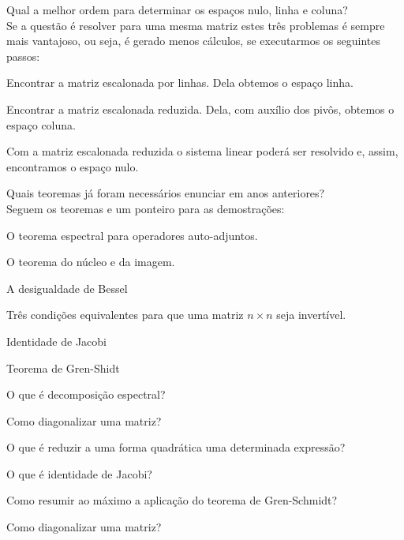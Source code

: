 Qual a melhor ordem para determinar os espaços nulo, linha e coluna?
\\Se a questão é resolver para uma mesma matriz estes três problemas é sempre mais vantajoso, ou seja, é gerado menos cálculos, se executarmos os seguintes passos:
\item Encontrar a matriz escalonada por linhas. Dela obtemos o espaço linha.
\item Encontrar a matriz escalonada reduzida. Dela, com auxílio dos pivôs, obtemos o espaço coluna.
\item Com a matriz escalonada reduzida o sistema linear poderá ser resolvido e, assim, encontramos o espaço nulo.

Quais teoremas já foram necessários enunciar em anos anteriores?
\\Seguem os teoremas e um ponteiro para as demostrações:
\item O teorema espectral para operadores auto-adjuntos. \cite{x}
\item O teorema do núcleo e da imagem. \cite{y}
\item A desigualdade de Bessel
\item Três condições equivalentes para que uma matriz $n\times n$ seja invertível.
\item Identidade de Jacobi
\item Teorema de Gren-Shidt \cite{406}

O que é decomposição espectral?

Como diagonalizar uma matriz?

O que é reduzir a uma forma quadrática uma determinada expressão?

O que é identidade de Jacobi?

Como resumir ao máximo a aplicação do teorema de Gren-Schmidt? \cite{406}

Como diagonalizar uma matriz? \cite{158}




